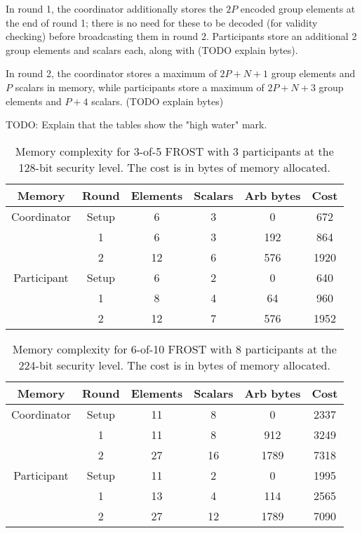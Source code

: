 In round 1, the coordinator additionally stores the $2P$ encoded group elements
at the end of round 1; there is no need for these to be decoded (for validity
checking) before broadcasting them in round 2. Participants store an additional
2 group elements and scalars each, along with (TODO explain bytes).

In round 2, the coordinator stores a maximum of $2P + N + 1$ group elements and
$P$ scalars in memory, while participants store a maximum of $2P + N + 3$ group
elements and $P + 4$ scalars. (TODO explain bytes)

TODO: Explain that the tables show the "high water" mark.

\begin{table}
	\centering
	\begin{tabular}{c c c c c c}
		\toprule
		Memory & Round & Elements & Scalars & Arb bytes & Cost \\ \midrule
		Coordinator & Setup & 6 & 3 & 0 & 672 \\
		            & 1 & 6 & 3 & 192 & 864 \\
		            & 2 & 12 & 6 & 576 & 1920 \\
		\midrule
		Participant & Setup & 6 & 2 & 0 & 640 \\
		            & 1 & 8 & 4 & 64 & 960 \\
		            & 2 & 12 & 7 & 576 & 1952 \\
		\bottomrule
	\end{tabular}
	\caption{Memory complexity for 3-of-5 FROST with 3 participants at the 128-bit security level. The cost is in bytes of memory allocated.}
\end{table}

\begin{table}
	\centering
	\begin{tabular}{c c c c c c}
		\toprule
		Memory & Round & Elements & Scalars & Arb bytes & Cost \\ \midrule
		Coordinator & Setup & 11 & 8 & 0 & 2337 \\
		            & 1 & 11 & 8 & 912 & 3249 \\
		            & 2 & 27 & 16 & 1789 & 7318 \\
		\midrule
		Participant & Setup & 11 & 2 & 0 & 1995 \\
		            & 1 & 13 & 4 & 114 & 2565 \\
		            & 2 & 27 & 12 & 1789 & 7090 \\
		\bottomrule
	\end{tabular}
	\caption{Memory complexity for 6-of-10 FROST with 8 participants at the 224-bit security level. The cost is in bytes of memory allocated.}
\end{table}

